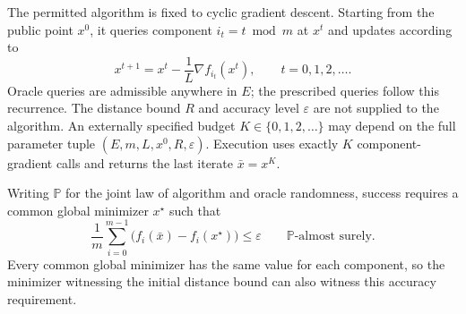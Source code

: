 \documentclass[10pt]{article}
\theoremstyle{definition}
\begin{document}
The permitted algorithm is fixed to cyclic gradient descent. Starting from the public point $x^0$, it queries component $i_t=t\bmod m$ at $x^t$ and updates according to
\[
x^{t+1}=x^t-\frac{1}{L}\nabla f_{i_t}(x^t),
\qquad t=0,1,2,\ldots.
\]
Oracle queries are admissible anywhere in $E$; the prescribed queries follow this recurrence. The distance bound $R$ and accuracy level $\varepsilon$ are not supplied to the algorithm. An externally specified budget $K\in\{0,1,2,\ldots\}$ may depend on the full parameter tuple $(E,m,L,x^0,R,\varepsilon)$. Execution uses exactly $K$ component-gradient calls and returns the last iterate $\bar{x}=x^K$.

Writing $\mathbb{P}$ for the joint law of algorithm and oracle randomness, success requires a common global minimizer $x^\star$ such that
\[
\frac{1}{m}\sum_{i=0}^{m-1}
\bigl(f_i(\bar{x})-f_i(x^\star)\bigr)
\leq\varepsilon
\qquad \mathbb{P}\text{-almost surely}.
\]
Every common global minimizer has the same value for each component, so the minimizer witnessing the initial distance bound can also witness this accuracy requirement.
\end{document}
